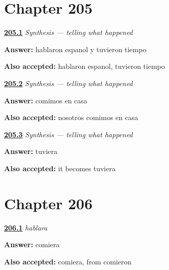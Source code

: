 \section*{Chapter 205}

\noindent\begin{minipage}[t]{\linewidth}
\raggedright
\hyperlink{review-ES-C55-sintesis-preterito-completo-story}{\textbf{205.1}} \emph{Synthesis — telling what happened}\par
\small \textbf{Answer:} hablaron espanol y tuvieron tiempo\par
\footnotesize \textbf{Also accepted:} hablaron espanol, tuvieron tiempo
\end{minipage}\par\medskip

\noindent\begin{minipage}[t]{\linewidth}
\raggedright
\hyperlink{review-ES-C55-sintesis-preterito-completo-we}{\textbf{205.2}} \emph{Synthesis — telling what happened}\par
\small \textbf{Answer:} comimos en casa\par
\footnotesize \textbf{Also accepted:} nosotros comimos en casa
\end{minipage}\par\medskip

\noindent\begin{minipage}[t]{\linewidth}
\raggedright
\hyperlink{review-ES-C55-sintesis-preterito-completo-raw}{\textbf{205.3}} \emph{Synthesis — telling what happened}\par
\small \textbf{Answer:} tuviera\par
\footnotesize \textbf{Also accepted:} it becomes tuviera
\end{minipage}\par\medskip

\section*{Chapter 206}

\noindent\begin{minipage}[t]{\linewidth}
\raggedright
\hyperlink{review-ES-C56-hablara-build}{\textbf{206.1}} \emph{hablara}\par
\small \textbf{Answer:} comiera\par
\footnotesize \textbf{Also accepted:} comiera, from comieron
\end{minipage}\par\medskip

